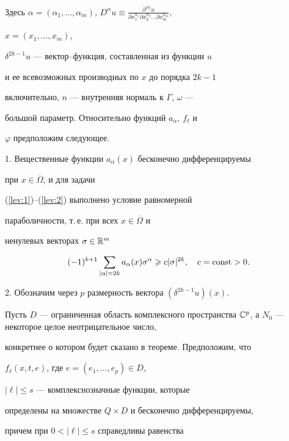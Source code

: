 Здесь $\alpha=(\alpha_1,\dotsc,\alpha_m)$, $D^\alpha


u\equiv\frac{\partial^{|\alpha|}u}


{\partial x_1^{\alpha_1}\partial x_2^{\alpha_2}\dotsc


\partial x_m^{\alpha_m}}$,


$x=(x_1,\dotsc,x_m)$,


$\delta^{2k-1}u$ --- вектор--функция, составленная из функции $u$


и ее всевозможных производных по $x$ до порядка $2k-1$


включительно, $n$ --- внутренняя нормаль к $\Gamma$, $\omega$ ---


большой параметр. Относительно функций $a_\alpha$, $f_\ell$ и


$\varphi$ предположим следующее.





1. Вещественные функции $a_\alpha(x)$ бесконечно дифференцируемы


при $x\in \overline{\Omega}$, и для задачи\linebreak


(\ref{lev:1})--(\ref{lev:2}) выполнено условие равномерной


параболичности, т.\,е. при всех $x\in \overline{\Omega}$ и


ненулевых векторах $\sigma\in\Bbb R^m$


$$


(-1)^{k+1} \sum_{|\alpha|=2k} a_\alpha(x)\sigma^\alpha


\geqslant c|\sigma|^{2k},\quad c=\const>0.


$$





2. Обозначим через $p$ размерность вектора $(\delta^{2k-1}u)(x)$.


Пусть $D$ --- ограниченная область комплексного пространства $\Bbb


C^p$, а $N_0$ --- некоторое целое неотрицательное число,


конкретнее о котором будет сказано в теореме. Предположим, что


$f_\ell(x,t,e)$, где $e=(e_1,\dotsc,e_p)\in D$,


$|\ell|\leqslant s$ --- комплекснозначные функции, которые


определены на множестве $Q\times D$ и бесконечно дифференцируемы,


причем при $0<|\ell|\leqslant s$ справедливы равенства


